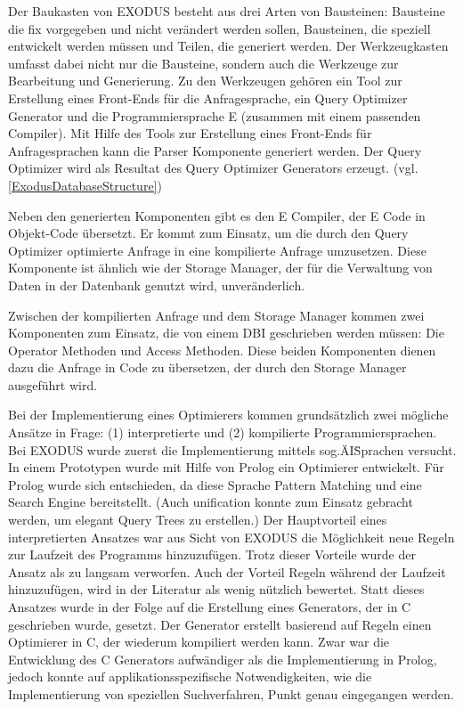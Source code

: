 Der Baukasten von EXODUS besteht aus drei Arten von Bausteinen: Bausteine die fix vorgegeben und nicht verändert werden sollen, Bausteinen, die speziell entwickelt werden müssen und Teilen, die generiert werden. Der Werkzeugkasten umfasst dabei nicht nur die Bausteine, sondern auch die Werkzeuge zur Bearbeitung und Generierung. Zu den Werkzeugen gehören ein Tool zur Erstellung eines Front-Ends für die Anfragesprache, ein Query Optimizer Generator und die Programmiersprache E (zusammen mit einem passenden Compiler). Mit Hilfe des Tools zur Erstellung eines Front-Ends für Anfragesprachen kann die Parser Komponente generiert werden. Der Query Optimizer wird als Resultat des Query Optimizer Generators erzeugt. (vgl. \ref{ExodusDatabaseStructure})

Neben den generierten Komponenten gibt es den E Compiler, der E Code in Objekt-Code übersetzt. Er kommt zum Einsatz, um die durch den Query Optimizer optimierte Anfrage in eine kompilierte Anfrage umzusetzen. Diese Komponente ist ähnlich wie der Storage Manager, der für die Verwaltung von Daten in der Datenbank genutzt wird, unveränderlich. 

Zwischen der kompilierten Anfrage und dem Storage Manager kommen zwei Komponenten zum Einsatz, die von einem DBI geschrieben werden müssen: Die Operator Methoden und Access Methoden. Diese beiden Komponenten dienen dazu die Anfrage in Code zu übersetzen, der durch den  Storage Manager ausgeführt wird.

Bei der Implementierung eines Optimierers kommen grundsätzlich zwei mögliche Ansätze in Frage: (1) interpretierte und (2) kompilierte Programmiersprachen. Bei EXODUS wurde zuerst die Implementierung mittels sog.\"AI\" Sprachen versucht. In einem Prototypen wurde mit Hilfe von Prolog ein Optimierer entwickelt. Für Prolog wurde sich entschieden, da diese Sprache Pattern Matching und eine Search Engine bereitstellt. (Auch unification konnte zum Einsatz gebracht werden, um elegant Query Trees zu erstellen.) Der Hauptvorteil eines interpretierten Ansatzes war aus Sicht von EXODUS die Möglichkeit neue Regeln zur Laufzeit des Programms hinzuzufügen. Trotz dieser Vorteile wurde der Ansatz als zu langsam verworfen. Auch der Vorteil Regeln während der Laufzeit hinzuzufügen, wird in der Literatur  als wenig nützlich bewertet. Statt dieses Ansatzes wurde in der Folge auf die Erstellung eines Generators, der in C geschrieben wurde, gesetzt. Der Generator erstellt basierend auf Regeln einen Optimierer in C, der wiederum kompiliert werden kann. Zwar war die Entwicklung des C Generators aufwändiger als die Implementierung in Prolog, jedoch konnte auf applikationsspezifische Notwendigkeiten, wie die Implementierung von speziellen Suchverfahren, Punkt genau eingegangen werden.


